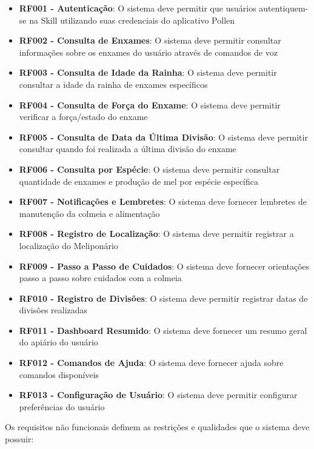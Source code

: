\begin{itemize}
    \item \textbf{RF001 - Autenticação}: O sistema deve permitir que usuários autentiquem-se na Skill utilizando suas credenciais do aplicativo Pollen
    \item \textbf{RF002 - Consulta de Enxames}: O sistema deve permitir consultar informações sobre os enxames do usuário através de comandos de voz
    \item \textbf{RF003 - Consulta de Idade da Rainha}: O sistema deve permitir consultar a idade da rainha de enxames específicos
    \item \textbf{RF004 - Consulta de Força do Enxame}: O sistema deve permitir verificar a força/estado do enxame
    \item \textbf{RF005 - Consulta de Data da Última Divisão}: O sistema deve permitir consultar quando foi realizada a última divisão do enxame
    \item \textbf{RF006 - Consulta por Espécie}: O sistema deve permitir consultar quantidade de enxames e produção de mel por espécie específica
    \item \textbf{RF007 - Notificações e Lembretes}: O sistema deve fornecer lembretes de manutenção da colmeia e alimentação
    \item \textbf{RF008 - Registro de Localização}: O sistema deve permitir registrar a localização do Meliponário
    \item \textbf{RF009 - Passo a Passo de Cuidados}: O sistema deve fornecer orientações passo a passo sobre cuidados com a colmeia
    \item \textbf{RF010 - Registro de Divisões}: O sistema deve permitir registrar datas de divisões realizadas
    \item \textbf{RF011 - Dashboard Resumido}: O sistema deve fornecer um resumo geral do apiário do usuário
    \item \textbf{RF012 - Comandos de Ajuda}: O sistema deve fornecer ajuda sobre comandos disponíveis
    \item \textbf{RF013 - Configuração de Usuário}: O sistema deve permitir configurar preferências do usuário
\end{itemize}


Os requisitos não funcionais definem as restrições e qualidades que o sistema deve possuir:

